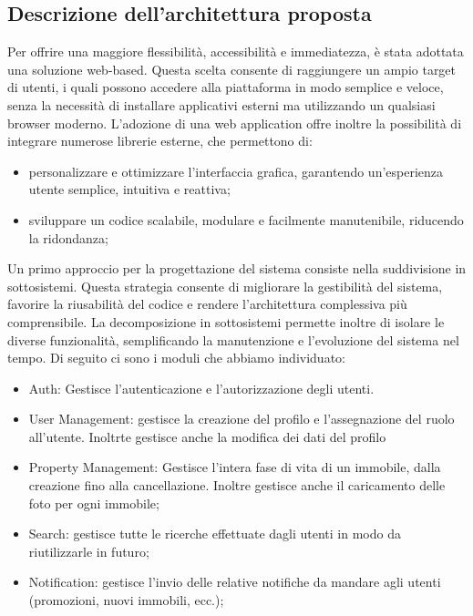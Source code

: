 \documentclass{article}
\begin{document}
\vspace{0.25cm} %
\noindent %
\subsection{Descrizione dell’architettura proposta}
Per offrire una maggiore flessibilità, accessibilità e immediatezza, è stata adottata una soluzione web-based.
Questa scelta consente di raggiungere un ampio target di utenti, i quali possono accedere alla piattaforma in modo semplice e veloce, senza la necessità di installare applicativi esterni ma utilizzando un qualsiasi browser moderno.
L’adozione di una web application offre inoltre la possibilità di integrare numerose librerie esterne, che permettono di:
\begin{itemize}
    \item personalizzare e ottimizzare l’interfaccia grafica, garantendo un’esperienza utente semplice, intuitiva e reattiva;
    \item sviluppare un codice scalabile, modulare e facilmente manutenibile, riducendo la ridondanza;
\end{itemize}


\vspace{0.25cm} %
\noindent %
Un primo approccio per la progettazione del sistema consiste nella suddivisione in sottosistemi.
Questa strategia consente di migliorare la gestibilità del sistema, favorire la riusabilità del codice e rendere l’architettura complessiva più comprensibile.
La decomposizione in sottosistemi permette inoltre di isolare le diverse funzionalità, semplificando la manutenzione e l’evoluzione del sistema nel tempo.
Di seguito ci sono i moduli che abbiamo individuato:
\begin{itemize}
    \item Auth: Gestisce l'autenticazione e l'autorizzazione degli utenti.
    \item User Management: gestisce la  creazione del profilo e l'assegnazione del ruolo all'utente. Inoltrte gestisce anche la modifica dei dati del profilo
    \item Property Management: Gestisce l'intera fase di vita di un immobile, dalla creazione fino alla cancellazione. Inoltre gestisce anche il caricamento delle foto per ogni immobile;
    \item Search: gestisce tutte le ricerche effettuate dagli utenti in modo da riutilizzarle in futuro;
    \item Notification: gestisce l'invio delle relative notifiche da mandare agli utenti (promozioni, nuovi immobili, ecc.);
\end{itemize}
\end{document}
